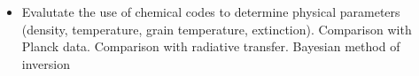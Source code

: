 \begin{itemize}
\item{Evalutate the use of chemical codes  to determine physical parameters (density, temperature, grain temperature, extinction). Comparison with Planck data. Comparison with radiative transfer. Bayesian method of inversion}
\end{itemize}
  
  
  
  
  
  
  
  
  
  
  
  